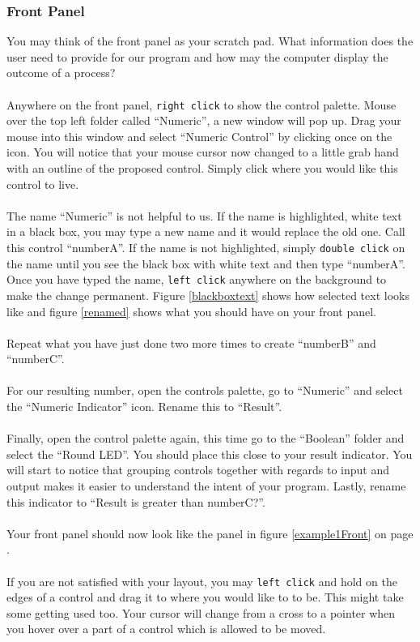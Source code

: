 	\subsubsection{Front Panel}
	You may think of the front panel as your scratch pad. What information does the user need to provide for our program and how may the computer display the outcome of a process?\\
	\\
	Anywhere on the front panel, \texttt{right click} to show the control palette. Mouse over the top left folder called ``Numeric'', a new window will pop up. Drag your mouse into this window and select ``Numeric Control'' by clicking once on the icon. You will notice that your mouse cursor now changed to a little grab hand with an outline of the proposed control. Simply click where you would like this control to live.\\
	\\
	The name ``Numeric'' is not helpful to us. If the name is highlighted, white text in a black box, you may type a new name and it would replace the old one. Call this control ``numberA''. If the name is not highlighted, simply \texttt{double click} on the name until you see the black box with white text and then type ``numberA''. Once you have typed the name, \texttt{left click} anywhere on the background to make the change permanent. Figure \ref{blackboxtext} shows how selected text looks like and figure \ref{renamed} shows what you should have on your front panel.\\
	\\
	Repeat what you have just done two more times to create ``numberB'' and ``numberC''.\\
	\\
	For our resulting number, open the controls palette, go to ``Numeric'' and select the ``Numeric Indicator'' icon. Rename this to ``Result''.\\
	\\
	Finally, open the control palette again, this time go to the ``Boolean'' folder and select the ``Round LED''. You should place this close to your result indicator. You will start to notice that grouping controls together with regards to input and output makes it easier to understand the intent of your program. Lastly, rename this indicator to ``Result is greater than numberC?''.\\
	\\
	Your front panel should now look like the panel in figure \ref{example1Front} on page \pageref{example1Front}.\\
	\\
	If you are not satisfied with your layout, you may \texttt{left click} and hold on the edges of a control and drag it to where you would like to to be. This might take some getting used too. Your cursor will change from a cross to a pointer when you hover over a part of a control which is allowed to be moved. %
